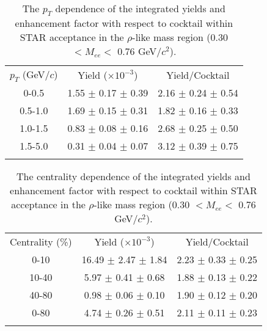 \begin{table}[htp]
\centering
\caption{The $p_{T}$ dependence of the integrated yields and enhancement factor with respect to cocktail within STAR acceptance in the $\rho$-like mass region (0.30 $<M_{ee}<$ 0.76 GeV/$c^{2}$).}
\label{diffpt_yields}
\begin{tabular}{ccc}
\Xhline{1.6pt}
 $p_{T}$ (GeV/$c$) &  Yield ($\times10^{-3}$) & Yield/Cocktail \\
\Xhline{1.2pt}
0-0.5    & 1.55 $\pm$ 0.17 $\pm$ 0.39 & 2.16 $\pm$ 0.24 $\pm$ 0.54 \\ 
0.5-1.0 & 1.69 $\pm$ 0.15 $\pm$ 0.31 & 1.82 $\pm$ 0.16 $\pm$ 0.33 \\ 
1.0-1.5 & 0.83 $\pm$ 0.08 $\pm$ 0.16 & 2.68 $\pm$ 0.25 $\pm$ 0.50 \\ 
1.5-5.0 & 0.31 $\pm$ 0.04 $\pm$ 0.07 & 3.12 $\pm$ 0.39 $\pm$ 0.75 \\ 
\Xhline{1.6pt}
\end{tabular}
\end{table}

\begin{table}[htp]
\centering
\caption{The centrality dependence of the integrated yields and enhancement factor with respect to cocktail within STAR acceptance in the $\rho$-like mass region (0.30 $<M_{ee}<$ 0.76 GeV/$c^{2}$).}
\label{diffcen_yields}
\begin{tabular}{ccc}
\Xhline{1.6pt}
 Centrality (\%) &  Yield ($\times10^{-3}$) & Yield/Cocktail \\
\Xhline{1.2pt}
0-10   & 16.49 $\pm$ 2.47 $\pm$ 1.84 & 2.23 $\pm$ 0.33 $\pm$ 0.25 \\ 
10-40 &   5.97 $\pm$ 0.41 $\pm$ 0.68 & 1.88 $\pm$ 0.13 $\pm$ 0.22 \\ 
40-80 &   0.98 $\pm$ 0.06 $\pm$ 0.10 & 1.90 $\pm$ 0.12 $\pm$ 0.20 \\ 
0-80   &   4.74 $\pm$ 0.26 $\pm$ 0.51 & 2.11 $\pm$ 0.11 $\pm$ 0.23 \\ 
\Xhline{1.6pt}
\end{tabular}
\end{table}

